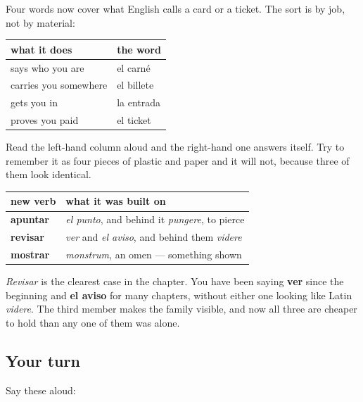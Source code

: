 \begin{grammarlens}[title={Grammar Lens: which slip of paper}]
Four words now cover what English calls a card or a ticket. The sort is by job, not by material:

\noindent
\begin{tabularx}{\linewidth}{@{}>{\raggedright\arraybackslash}X>{\raggedright\arraybackslash}X@{}}
\toprule
\textbf{what it does} & \textbf{the word} \\
\midrule
says who you are & el carné \\
carries you somewhere & el billete \\
gets you in & la entrada \\
proves you paid & el ticket \\
\bottomrule
\end{tabularx}

Read the left-hand column aloud and the right-hand one answers itself. Try to remember it as four pieces of plastic and paper and it will not, because three of them look identical.
\end{grammarlens}

\begin{grammarlens}[title={Grammar Lens: two verbs you already half-owned}]
\noindent
\begin{tabularx}{\linewidth}{@{}>{\raggedright\arraybackslash}X>{\raggedright\arraybackslash}X@{}}
\toprule
\textbf{new verb} & \textbf{what it was built on} \\
\midrule
\textbf{apuntar} & \emph{el punto}, and behind it \emph{pungere}, to pierce \\
\textbf{revisar} & \emph{ver} and \emph{el aviso}, and behind them \emph{videre} \\
\textbf{mostrar} & \emph{monstrum}, an omen — something shown \\
\bottomrule
\end{tabularx}

\emph{Revisar} is the clearest case in the chapter. You have been saying \textbf{ver} since the beginning and \textbf{el aviso} for many chapters, without either one looking like Latin \emph{videre}. The third member makes the family visible, and now all three are cheaper to hold than any one of them was alone.
\end{grammarlens}

\subsection*{Your turn}
Say these aloud:

